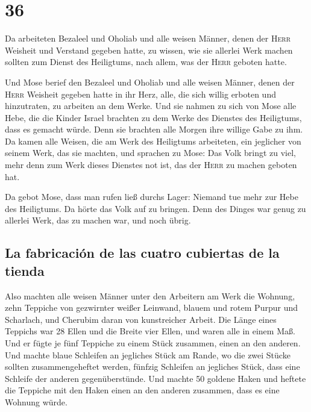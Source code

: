 \hypertarget{section-35}{%
\section{36}\label{section-35}}

 Da arbeiteten Bezaleel und Oholiab und alle weisen
Männer, denen der \textsc{Herr} Weisheit und Verstand gegeben hatte, zu
wissen, wie sie allerlei Werk machen sollten zum Dienst des Heiligtums,
nach allem, was der \textsc{Herr} geboten hatte.

 Und Mose berief den Bezaleel und Oholiab und alle weisen
Männer, denen der \textsc{Herr} Weisheit gegeben hatte in ihr Herz,
alle, die sich willig erboten und hinzutraten, zu arbeiten an dem Werke.
 Und sie nahmen zu sich von Mose alle Hebe, die die Kinder
Israel brachten zu dem Werke des Dienstes des Heiligtums, dass es
gemacht würde. Denn sie brachten alle Morgen ihre willige Gabe zu ihm.
 Da kamen alle Weisen, die am Werk des Heiligtums
arbeiteten, ein jeglicher von seinem Werk, das sie machten,
 und sprachen zu Mose: Das Volk bringt zu viel, mehr denn
zum Werk dieses Dienstes not ist, das der \textsc{Herr} zu machen
geboten hat.

 Da gebot Mose, dass man rufen ließ durchs Lager: Niemand
tue mehr zur Hebe des Heiligtums. Da hörte das Volk auf zu bringen.
 Denn des Dinges war genug zu allerlei Werk, das zu machen
war, und noch übrig.

\hypertarget{la-fabricaciuxf3n-de-las-cuatro-cubiertas-de-la-tienda}{%
\subsection{La fabricación de las cuatro cubiertas de la
tienda}\label{la-fabricaciuxf3n-de-las-cuatro-cubiertas-de-la-tienda}}

 Also machten alle weisen Männer unter den Arbeitern am
Werk die Wohnung, zehn Teppiche von gezwirnter weißer Leinwand, blauem
und rotem Purpur und Scharlach, und Cherubim daran von kunstreicher
Arbeit.  Die Länge eines Teppichs war 28 Ellen und die
Breite vier Ellen, und waren alle in einem Maß.  Und er
fügte je fünf Teppiche zu einem Stück zusammen, einen an den anderen.
 Und machte blaue Schleifen an jegliches Stück am Rande,
wo die zwei Stücke sollten zusammengeheftet werden, 
fünfzig Schleifen an jegliches Stück, dass eine Schleife der anderen
gegenüberstünde.  Und machte 50 goldene Haken und heftete
die Teppiche mit den Haken einen an den anderen zusammen, dass es eine
Wohnung würde.

